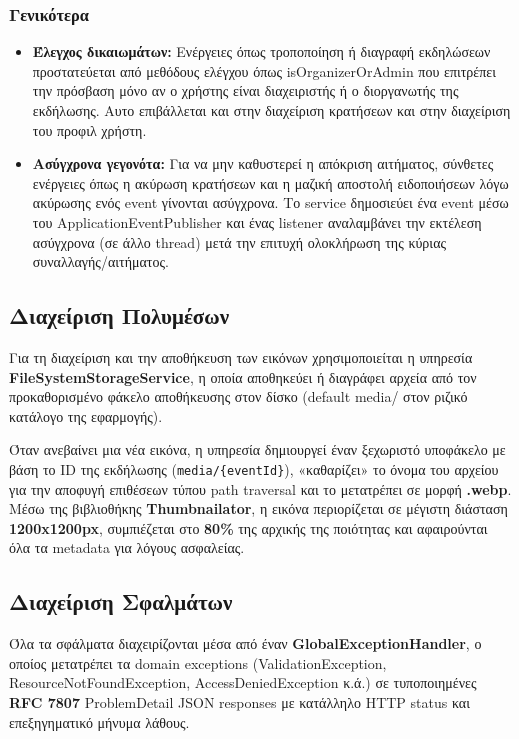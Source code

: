 \documentclass[12pt]{fphw}
\newcommand{\en}[1]{\foreignlanguage{english}{#1}}
\begin{document}
\subsubsection{Γενικότερα}
\begin{itemize}[leftmargin=*]
    \item \textbf{Έλεγχος δικαιωμάτων:} Ενέργειες όπως τροποποίηση ή διαγραφή εκδηλώσεων προστατεύεται από μεθόδους ελέγχου όπως \en{isOrganizerOrAdmin} που επιτρέπει την πρόσβαση μόνο αν ο χρήστης είναι διαχειριστής ή ο διοργανωτής της εκδήλωσης. Αυτο επιβάλλεται και στην διαχείριση κρατήσεων και στην διαχείριση του προφιλ χρήστη.
    \item \textbf{Ασύγχρονα γεγονότα:} Για να μην καθυστερεί η απόκριση αιτήματος, σύνθετες ενέργειες όπως η ακύρωση κρατήσεων και η μαζική αποστολή ειδοποιήσεων λόγω ακύρωσης ενός event γίνονται ασύγχρονα. Το service δημοσιεύει ένα event μέσω του \en{ApplicationEventPublisher} και ένας listener αναλαμβάνει την εκτέλεση ασύγχρονα (σε άλλο thread) μετά την επιτυχή ολοκλήρωση της κύριας συναλλαγής/αιτήματος.
\end{itemize}







\subsection{Διαχείριση Πολυμέσων}
Για τη διαχείριση και την αποθήκευση των εικόνων χρησιμοποιείται η υπηρεσία \en{\textbf{FileSystemStorageService}}, η οποία αποθηκεύει ή διαγράφει αρχεία από τον προκαθορισμένο φάκελο αποθήκευσης στον δίσκο (default \en{media/ στον ριζικό κατάλογο της εφαρμογής}).

Όταν ανεβαίνει μια νέα εικόνα, η υπηρεσία δημιουργεί έναν ξεχωριστό υποφάκελο με βάση το \en{ID} της εκδήλωσης (\en{\texttt{media/\{eventId\}}}), «καθαρίζει» το όνομα του αρχείου για την αποφυγή επιθέσεων τύπου \en{path traversal} και το μετατρέπει σε μορφή \en{\textbf{.webp}}. Μέσω της βιβλιοθήκης \en{\textbf{Thumbnailator}}, η εικόνα περιορίζεται σε μέγιστη διάσταση \en{\textbf{1200x1200px}}, συμπιέζεται στο \en{\textbf{80\%}} της αρχικής της ποιότητας και αφαιρούνται όλα τα metadata για λόγους ασφαλείας.


\subsection{Διαχείριση Σφαλμάτων}
Όλα τα σφάλματα διαχειρίζονται μέσα από έναν \en{\textbf{GlobalExceptionHandler}}, ο οποίος μετατρέπει τα \en{domain exceptions} (\en{ValidationException, ResourceNotFoundException, AccessDeniedException} κ.ά.) σε τυποποιημένες \en{\textbf{RFC 7807} ProblemDetail JSON responses} με κατάλληλο \en{HTTP status} και επεξηγηματικό μήνυμα λάθους.
\end{document}

